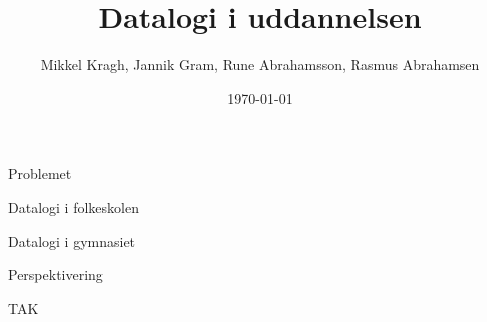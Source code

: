 \documentclass{beamer}
\title[Datalogi i uddannelsen]{Datalogi i uddannelsen}
\author{Mikkel Kragh, Jannik Gram, Rune Abrahamsson, Rasmus Abrahamsen}
\institute{DIKU}
\date{\today}
\begin{document}
\begin{frame}
\titlepage
\end{frame}


\begin{frame}{Problemet}
\end{frame}

\begin{frame}{Datalogi i folkeskolen}

\end{frame}

\begin{frame}{Datalogi i gymnasiet}

\end{frame}

\begin{frame}{Perspektivering}

\end{frame}

\begin{frame}{TAK}

\end{frame}
\end{document}
